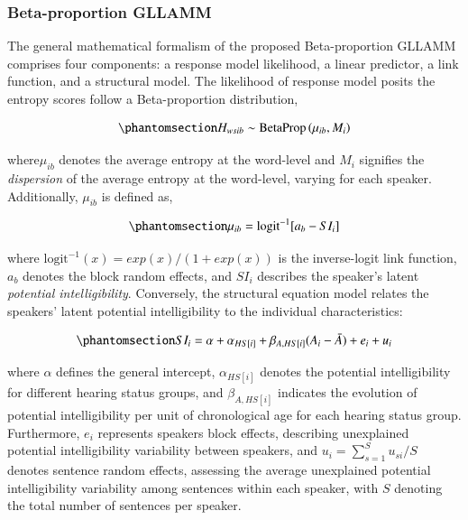 \documentclass[
  authoryear,
  preprint,
  1p]{elsarticle}
\begin{document}
\subsubsection{Beta-proportion GLLAMM}\label{sec-M-SM-BGLLAMM}

The general mathematical formalism of the proposed Beta-proportion
GLLAMM comprises four components: a response model likelihood, a linear
predictor, a link function, and a structural model. The likelihood of
response model posits the entropy scores follow a Beta-proportion
distribution,

\begin{equation}\phantomsection\label{eq-beta-GLLAMM-likelihood}{
H_{wsib} \sim \text{BetaProp} \left( \mu_{ib}, M_{i} \right)
}\end{equation}

where\(\mu_{ib}\) denotes the average entropy at the word-level and
\(M_{i}\) signifies the \emph{dispersion} of the average entropy at the
word-level, varying for each speaker. Additionally, \(\mu_{ib}\) is
defined as,

\begin{equation}\phantomsection\label{eq-beta-GLLAMM-linpred}{
\mu_{ib} = \text{logit}^{-1}[ a_{b} - SI_{i} ]
}\end{equation}

where \(\text{logit}^{-1}(x) = exp(x) / (1+exp(x))\) is the
inverse-logit link function, \(a_{b}\) denotes the block random effects,
and \(SI_{i}\) describes the speaker's latent \emph{potential
intelligibility}. Conversely, the structural equation model relates the
speakers' latent potential intelligibility to the individual
characteristics:

\begin{equation}\phantomsection\label{eq-beta-GLLAMM-structural}{
SI_{i} = \alpha + \alpha_{HS[i]} + \beta_{A, HS[i]} (A_{i} - \bar{A}) + e_{i} + u_{i}
}\end{equation}

where \(\alpha\) defines the general intercept, \(\alpha_{HS[i]}\)
denotes the potential intelligibility for different hearing status
groups, and \(\beta_{A,HS[i]}\) indicates the evolution of potential
intelligibility per unit of chronological age for each hearing status
group. Furthermore, \(e_{i}\) represents speakers block effects,
describing unexplained potential intelligibility variability between
speakers, and \(u_{i} = \sum_{s=1}^{S} u_{si}/S\) denotes sentence
random effects, assessing the average unexplained potential
intelligibility variability among sentences within each speaker, with
\(S\) denoting the total number of sentences per speaker.
\end{document}
